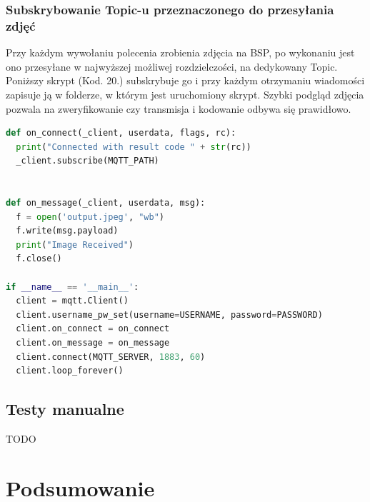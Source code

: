 \subsubsection{Subskrybowanie Topic-u przeznaczonego do przesyłania zdjęć}

Przy każdym wywołaniu polecenia zrobienia zdjęcia na BSP, po wykonaniu jest ono przesyłane w najwyższej możliwej rozdzielczości, na dedykowany Topic. Poniższy skrypt (Kod. 20.) subskrybuje go i przy każdym otrzymaniu wiadomości zapisuje ją w folderze, w którym jest uruchomiony skrypt. Szybki podgląd zdjęcia pozwala na zweryfikowanie czy transmisja i kodowanie odbywa się prawidłowo.


\begin{lstlisting}[language=Python, caption=Skryt nasuchujący na podanym topicu MQTT i zapisujący dane z wiadomości MQTT w formacie /text{jpeg}]
def on_connect(_client, userdata, flags, rc):
  print("Connected with result code " + str(rc))
  _client.subscribe(MQTT_PATH)


def on_message(_client, userdata, msg):
  f = open('output.jpeg', "wb")
  f.write(msg.payload)
  print("Image Received")
  f.close()

if __name__ == '__main__':
  client = mqtt.Client()
  client.username_pw_set(username=USERNAME, password=PASSWORD)
  client.on_connect = on_connect
  client.on_message = on_message
  client.connect(MQTT_SERVER, 1883, 60)
  client.loop_forever()

\end{lstlisting}


\subsection{Testy manualne}
TODO

\clearpage \section*{Podsumowanie} 


